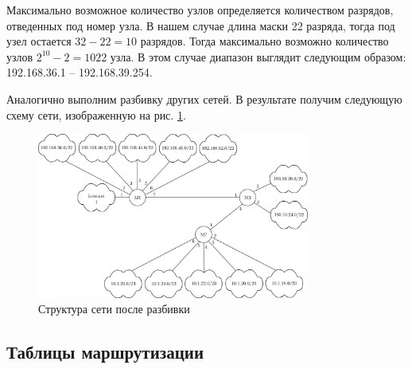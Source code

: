 \documentclass[a4paper, 14pt]{extarticle}
\begin{document}
Максимально возможное количество узлов определяется количеством разрядов,
отведенных под номер узла. В нашем случае длина маски 22 разряда, тогда под узел
остается \(32 - 22 = 10\) разрядов. Тогда максимально возможно количество узлов
\(2^{10} - 2 = 1022\) узла. В этом случае диапазон выглядит следующим образом:
192.168.36.1 – 192.168.39.254.

Аналогично выполним разбивку других сетей. В результате получим следующую схему
сети, изображенную на рис. \ref{fig:network-scheme-2}.

\begin{figure}[H]
  \centering
  \includegraphics[width=0.8\textwidth]{images/network-scheme-2.png}
  \caption{Структура сети после разбивки}
  \label{fig:network-scheme-2}
\end{figure}

\subsection{Таблицы маршрутизации}
\end{document}
